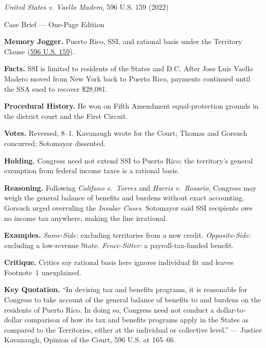 \documentclass[12pt]{article}
\begin{document}
\begin{center}
{\Large \textit{United States v. Vaello Madero}, 596 U.S. 159 (2022)\par}
\vspace{0.3em}
{\normalsize Case Brief --- One-Page Edition\par}
\end{center}

\textbf{Memory Jogger.} Puerto Rico, SSI, and rational basis under the Territory Clause (\href{https://www.law.cornell.edu/supremecourt/text/20-303}{596 U.S. 159}).

\textbf{Facts.} SSI is limited to residents of the States and D.C. After Jose Luis Vaello Madero moved from New York back to Puerto Rico, payments continued until the SSA sued to recover \$28,081.

\textbf{Procedural History.} He won on Fifth Amendment equal-protection grounds in the district court and the First Circuit.

\textbf{Votes.} Reversed, 8--1. Kavanaugh wrote for the Court; Thomas and Gorsuch concurred; Sotomayor dissented.

\textbf{Holding.} Congress need not extend SSI to Puerto Rico; the territory's general exemption from federal income taxes is a rational basis.

\textbf{Reasoning.} Following \textit{Califano v.\ Torres} and \textit{Harris v.\ Rosario}, Congress may weigh the general balance of benefits and burdens without exact accounting. Gorsuch urged overruling the \textit{Insular Cases}. Sotomayor said SSI recipients owe no income tax anywhere, making the line irrational.

\textbf{Examples.} \emph{Same-Side:} excluding territories from a new credit. \emph{Opposite-Side:} excluding a low-revenue State. \emph{Fence-Sitter:} a payroll-tax-funded benefit.

\textbf{Critique.} Critics say rational basis here ignores individual fit and leaves Footnote~1 unexplained.

\textbf{Key Quotation.} ``In devising tax and benefits programs, it is reasonable for Congress to take account of the general balance of benefits to and burdens on the residents of Puerto Rico. In doing so, Congress need not conduct a dollar-to-dollar comparison of how its tax and benefits programs apply in the States as compared to the Territories, either at the individual or collective level.'' --- Justice Kavanaugh, Opinion of the Court, 596 U.S. at 165--66.
\end{document}
